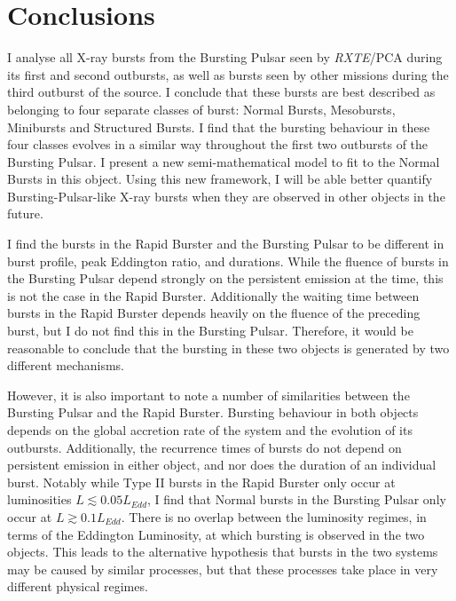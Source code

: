 \section{Conclusions}

\par I analyse all X-ray bursts from the Bursting Pulsar seen by \indexpca\textit{RXTE}/PCA during its first and second outbursts, as well as bursts seen by other missions during the third outburst of the source.  I conclude that these bursts are best described as belonging to four separate classes of burst: Normal Bursts, Mesobursts, Minibursts and Structured Bursts.  I find that the bursting behaviour in these four classes evolves in a similar way throughout the first two outbursts of the Bursting Pulsar.  I present a new semi-mathematical model to fit to the Normal Bursts in this object.  Using this new framework, I will be able better quantify Bursting-Pulsar-like X-ray bursts when they are observed in other objects in the future.
\par I find the bursts in the Rapid Burster and the Bursting Pulsar to be different in burst profile, peak Eddington ratio, and durations.  While the fluence of bursts in the Bursting Pulsar depend strongly on the persistent emission at the time, this is not the case in the Rapid Burster.  Additionally the waiting time between bursts in the Rapid Burster depends heavily on the fluence of the preceding burst, but I do not find this in the Bursting Pulsar.  Therefore, it would be reasonable to conclude that the bursting in these two objects is generated by two different mechanisms.
\par However, it is also important to note a number of similarities between the Bursting Pulsar and the Rapid Burster.  Bursting behaviour in both objects depends on the global accretion rate of the system and the evolution of its outbursts.  Additionally, the recurrence times of bursts do not depend on persistent emission in either object, and nor does the duration of an individual burst.  Notably while Type II bursts in the Rapid Burster only occur at luminosities $L\lesssim0.05L_{Edd}$, I find that Normal bursts in the Bursting Pulsar only occur at $L\gtrsim0.1L_{Edd}$.  There is no overlap between the luminosity regimes, in terms of the Eddington Luminosity, at which bursting is observed in the two objects.  This leads to the alternative hypothesis that bursts in the two systems may be caused by similar processes, but that these processes take place in very different physical regimes.